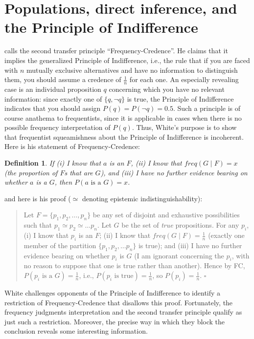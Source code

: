 \documentclass[letterpaper,12pt]{article}
\newtheorem{definition}{Definition}
\begin{document}
\section{Populations, direct inference, and the Principle of Indifference}
\label{sec:populations}
\cite{White2009-WHIESA} calls the second transfer principle ``Frequency-Credence''. He claims that it implies the generalized Principle of Indifference, i.e., the rule that if you are faced with $n$ mutually exclusive alternatives and have no information to distinguish them, you should assume a credence of $\frac{1}{n}$ for each one. An especially revealing case is an individual proposition $q$ concerning which you have no relevant information: since exactly one of $\{q, \neg q\}$ is true, the Principle of Indifference indicates that you should assign $P(q) = P(\neg q) = 0.5$. Such a principle is of course anathema to frequentists, since it is applicable in cases when there is no possible frequency interpretation of $P(q)$. Thus, White's purpose is to show that frequentist squeamishness about the Principle of Indifference is incoherent. Here is his statement of Frequency-Credence:
\begin{definition}
If (i) I know that $a$ is an $F$, (ii) I know that $\mathit{freq}(G \mid F) = x$ (the proportion of $F$s that are $G$), and (iii) I have no further evidence bearing on whether $a$ is a $G$, then $P(a\textrm{ is a }G) = x$.
\end{definition}
and here is his proof ($\simeq$ denoting epistemic indistinguishability):
\begin{quotation}
Let $F = \{p_1, p_2, \ldots, p_n\}$ be any set of disjoint and exhaustive possibilities such that $p_1 \simeq p_2 \simeq \ldots p_n$. Let $G$ be the set of \emph{true} propositions. For any $p_i$, (i) I know that $p_i$ is an $F$; (ii) I know that $\mathit{freq}(G \mid F) = \frac{1}{n}$ (exactly one member of the partition $\{p_1, p_2, \ldots p_n\}$ is true); and (iii) I have no further evidence bearing on whether $p_i$ is $G$ (I am ignorant concerning the $p_i$, with no reason to suppose that one is true rather than another). Hence by FC, $P(p_i\textrm{ is a }G) = \frac{1}{n}$, i.e., $P(p_i\textrm{ is true}) = \frac{1}{n}$, so $P(p_i) = \frac{1}{n}$. $\square$
\end{quotation}

White challenges opponents of the Principle of Indifference to identify a restriction of Frequency-Credence that disallows this proof. Fortunately, the frequency judgments interpretation and the second transfer principle qualify as just such a restriction. Moreover, the precise way in which they block the conclusion reveals some interesting information.
\end{document}
